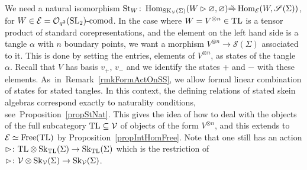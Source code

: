 \documentclass[pdftex]{sigma}%
\numberwithin{equation}{section}
\newcommand{\St}{\operatorname{St}}
\newcommand{\Free}{\operatorname{Free}}
\newcommand{\Hom}{\operatorname{Hom}}
\newcommand{\Oq}{\mathcal{O}_{q^2}({\rm SL}_2)}
\begin{document}
We need a natural isomorphism $\St_W\colon \Hom_{{\rm SK}_\mathcal{V}(\Sigma)}(W \rhd \varnothing,\varnothing) \tilde{\Rightarrow} \Hom_{\mathcal{E}}(W, \mathscr{S}(\Sigma))$, for $W \in \mathcal{E} = \Oq\text{-}{\rm comod}$. In the case where $W = V^{\otimes n}\in {\rm TL}$ is a tensor product of standard corepresentations, and the element on the left hand side is a tangle $\alpha$ with $n$ boundary points, we want a morphism $V^{\otimes n}\to \mathscr{S}(\Sigma)$ associated to it. This is done by setting the entries, elements of $V^{\otimes n}$, as states of the tangle $\alpha$. Recall that $V$ has basis $v_+$, $v_-$ and we identify the states + and $-$ with these elements. As~in~Remark~\ref{rmkFormActOnSS}, we allow formal linear combination of states for stated tangles. In this context, the defining relations of stated skein algebras correspond exactly to naturality conditions, see~Proposition~\ref{propStNat}.
This gives the idea of how to deal with the objects of the full subcategory ${\rm TL} \subseteq \mathcal{V}$ of objects of the form $V^{\otimes n}$, and this extends to $\mathcal{E} \simeq \Free({\rm TL})$ by Proposition~\ref{propIntHomFree}. Note that one still has an action $\rhd \colon {\rm TL} \otimes {\rm Sk}_{{\rm TL}}(\Sigma) \to {\rm Sk}_{{\rm TL}}(\Sigma)$ which is the restriction of $\rhd \colon \mathcal{V} \otimes {\rm Sk}_\mathcal{V}(\Sigma) \to {\rm Sk}_\mathcal{V}(\Sigma)$.
\end{document}
